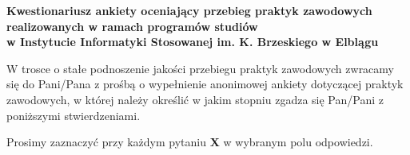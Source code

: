 \documentclass[11pt,a4paper]{article}
\begin{document}
\begin{center}
\textbf{\large Kwestionariusz ankiety oceniający przebieg praktyk zawodowych} \\[0.5em]
\textbf{\large realizowanych w ramach programów studiów} \\[0.5em]
\textbf{\large w Instytucie Informatyki Stosowanej im. K. Brzeskiego w Elblągu}
\end{center}

\vspace{1em}

\noindent W trosce o stałe podnoszenie jakości przebiegu praktyk zawodowych zwracamy się do Pani/Pana z prośbą o wypełnienie anonimowej ankiety dotyczącej praktyk zawodowych, w której należy określić w jakim stopniu zgadza się Pan/Pani z poniższymi stwierdzeniami. 

\vspace{0.5em}
\noindent Prosimy zaznaczyć przy każdym pytaniu \textbf{X} w wybranym polu odpowiedzi.

\vspace{1em}
\end{document}
